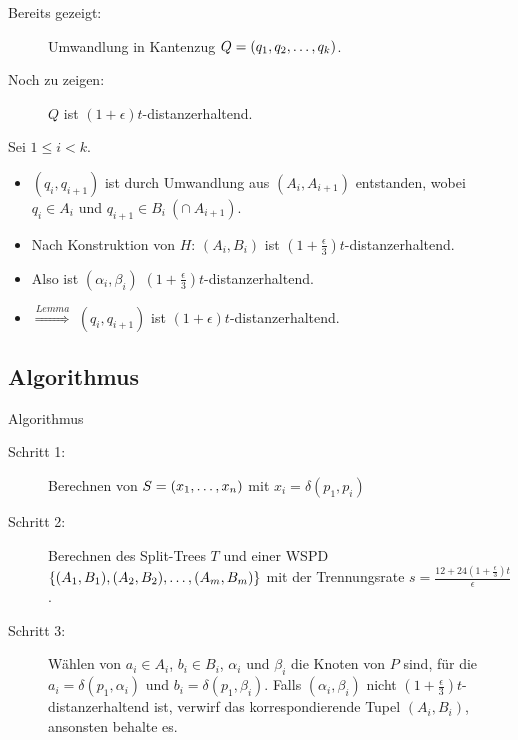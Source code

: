 \documentclass{beamer}
\begin{document}
	\begin{frame}
		\begin{description}
			\item[Bereits gezeigt: ] Umwandlung in Kantenzug $Q = (q_1, q_2, \mathellipsis, q_k)$.
			\item[Noch zu zeigen: ] $Q$ ist $(1 + \epsilon)t$-distanzerhaltend.
		\end{description}
		
		Sei $1 \leq i < k$.
		
		\begin{itemize}
			\item $(q_i, q_{i+1})$ ist durch Umwandlung aus $(A_i, A_{i+1})$ entstanden, wobei $q_i \in A_i$ und $q_{i+1} \in B_i\ (\cap\ A_{i+1})$.
			
			\item Nach Konstruktion von $H$: $(A_i, B_i)$ ist $(1 + \frac{\epsilon}{3})t$-distanzerhaltend.
			
			\item Also ist $(\alpha_i, \beta_i)$ $(1 + \frac{\epsilon}{3})t$-distanzerhaltend.
			
			\item $\stackrel{Lemma}{\Rightarrow}$ $(q_i, q_{i+1})$ ist $(1 + \epsilon)t$-distanzerhaltend.
		\end{itemize}
		
	\end{frame}
	
	\subsection{Algorithmus}
	\begin{frame}{Algorithmus}
		\begin{description}
			\item[Schritt 1:] Berechnen von $S = (x_1, \mathellipsis, x_n)$ mit $x_i = \delta(p_1, p_i)$
			\item[Schritt 2:] Berechnen des Split-Trees $T$ und einer WSPD $\{(A_1, B_1), (A_2, B_2), \mathellipsis, (A_m, B_m)\}$ mit der Trennungsrate $s = \frac{12 + 24(1 + \frac{\epsilon}{3})t}{\epsilon}$. 
			\item[Schritt 3:] Wählen von $a_i \in A_i$, $b_i \in B_i$, $\alpha_i$ und  $\beta_i$ die Knoten von $P$ sind, für die $a_i = \delta(p_1, \alpha_i)$ und $b_i = \delta(p_1, \beta_i)$. 
			Falls $(\alpha_i, \beta_i)$ nicht $(1+\frac{\epsilon}{3})t$-distanzerhaltend ist, verwirf das korrespondierende Tupel $(A_i, B_i)$, ansonsten behalte es.
		\end{description}
	\end{frame} 
	
\end{document}
